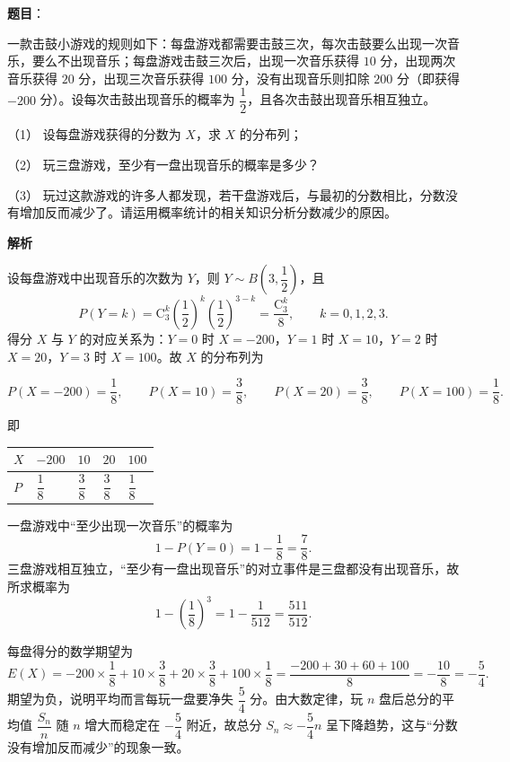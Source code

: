 \begin{answer}

\textbf{题目}：

一款击鼓小游戏的规则如下：每盘游戏都需要击鼓三次，每次击鼓要么出现一次音乐，要么不出现音乐；每盘游戏击鼓三次后，出现一次音乐获得 $10$ 分，出现两次音乐获得 $20$ 分，出现三次音乐获得 $100$ 分，没有出现音乐则扣除 $200$ 分（即获得 $-200$ 分）。设每次击鼓出现音乐的概率为 $\dfrac12$，且各次击鼓出现音乐相互独立。

（1） 设每盘游戏获得的分数为 $X$，求 $X$ 的分布列；

（2） 玩三盘游戏，至少有一盘出现音乐的概率是多少？

（3） 玩过这款游戏的许多人都发现，若干盘游戏后，与最初的分数相比，分数没有增加反而减少了。请运用概率统计的相关知识分析分数减少的原因。

\textbf{解析}


设每盘游戏中出现音乐的次数为 $Y$，则 $Y\sim B\left(3,\dfrac12\right)$，且
\nopagebreak[4]
\[P(Y=k)=\mathrm C_3^k\left(\frac12\right)^k\left(\frac12\right)^{3-k}=\frac{\mathrm C_3^k}8,\qquad k=0,1,2,3 .\]
得分 $X$ 与 $Y$ 的对应关系为：$Y=0$ 时 $X=-200$，$Y=1$ 时 $X=10$，$Y=2$ 时 $X=20$，$Y=3$ 时 $X=100$。故 $X$ 的分布列为

\nopagebreak[4]
\[P(X=-200)=\frac18,\qquad P(X=10)=\frac38,\qquad P(X=20)=\frac38,\qquad P(X=100)=\frac18 .\]

即

\begin{center}
\begin{tabular}{lllll}
\toprule
$X$ & $-200$ & $10$ & $20$ & $100$ \\
\midrule
$P$ & $\dfrac18$ & $\dfrac38$ & $\dfrac38$ & $\dfrac18$ \\
\bottomrule
\end{tabular}
\end{center}


一盘游戏中“至少出现一次音乐”的概率为
\nopagebreak[4]
\[1-P(Y=0)=1-\frac18=\frac78 .\]
三盘游戏相互独立，“至少有一盘出现音乐”的对立事件是三盘都没有出现音乐，故所求概率为
\nopagebreak[4]
\[1-\left(\frac18\right)^3=1-\frac1{512}=\frac{511}{512} .\]


每盘得分的数学期望为
\nopagebreak[4]
\[E(X)=-200\times\frac18+10\times\frac38+20\times\frac38+100\times\frac18
=\frac{-200+30+60+100}{8}=-\frac{10}8=-\frac54 .\]
期望为负，说明平均而言每玩一盘要净失 $\dfrac54$ 分。由大数定律，玩 $n$ 盘后总分的平均值 $\dfrac{S_n}{n}$ 随 $n$ 增大而稳定在 $-\dfrac54$ 附近，故总分 $S_n\approx-\dfrac54n$ 呈下降趋势，这与“分数没有增加反而减少”的现象一致。


\end{answer}
